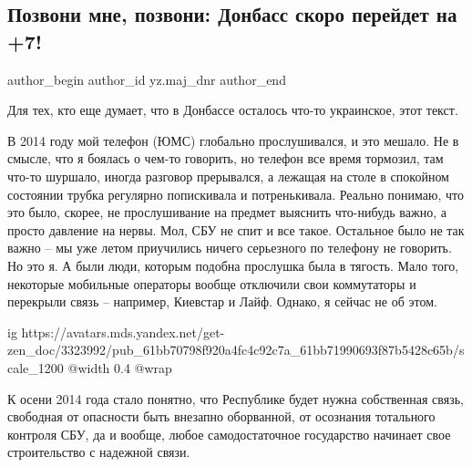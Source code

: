  
 
 
 
 
\subsection{Позвони мне, позвони: Донбасс скоро перейдет на +7!}
\label{sec:16_12_2021.yz.maj_dnr.1.svjaz_telefon_kod_7}


\ifcmt
 author_begin
   author_id yz.maj_dnr
 author_end
\fi

Для тех, кто еще думает, что в Донбассе осталось что-то украинское, этот текст.

В 2014 году мой телефон (ЮМС) глобально прослушивался, и это мешало. Не в
смысле, что я боялась о чем-то говорить, но телефон все время тормозил, там
что-то шуршало, иногда разговор прерывался, а лежащая на столе в спокойном
состоянии трубка регулярно попискивала и потренькивала. Реально понимаю, что
это было, скорее, не прослушивание на предмет выяснить что-нибудь важно, а
просто давление на нервы. Мол, СБУ не спит и все такое. Остальное было не так
важно – мы уже летом приучились ничего серьезного по телефону не говорить. Но
это я. А были люди, которым подобна прослушка была в тягость. Мало того,
некоторые мобильные операторы вообще отключили свои коммутаторы и перекрыли
связь – например, Киевстар и Лайф. Однако, я сейчас не об этом.

\ifcmt
  ig https://avatars.mds.yandex.net/get-zen_doc/3323992/pub_61bb70798f920a4fc4c92c7a_61bb71990693f87b5428c65b/scale_1200
  @width 0.4
  @wrap 
\fi

К осени 2014 года стало понятно, что Республике будет нужна собственная связь,
свободная от опасности быть внезапно оборванной, от осознания тотального
контроля СБУ, да и вообще, любое самодостаточное государство начинает свое
строительство с надежной связи.

